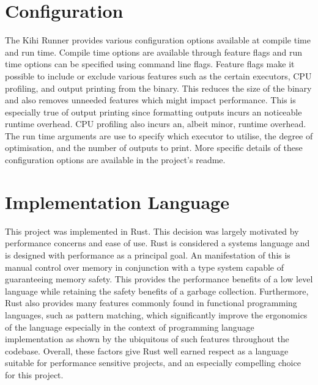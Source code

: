 \section{Configuration}
The Kihi Runner provides various configuration options available at compile time and run time. Compile time options are available through feature flags and run time options can be specified using command line flags. Feature flags make it possible to include or exclude various features such as the certain executors, CPU profiling, and output printing from the binary. This reduces the size of the binary and also removes unneeded features which might impact performance. This is especially true of output printing since formatting outputs incurs an noticeable runtime overhead. CPU profiling also incurs an, albeit minor, runtime overhead. The run time arguments are use to specify which executor to utilise, the degree of optimisation, and the number of outputs to print. More specific details of these configuration options are available in the project's readme.


\section{Implementation Language}
This project was implemented in Rust. This decision was largely motivated by performance concerns and ease of use. Rust is considered a systems language and is designed with performance as a principal goal. An manifestation of this is manual control over memory in conjunction with a type system capable of guaranteeing memory safety. This provides the performance benefits of a low level language while retaining the safety benefits of a garbage collection. Furthermore, Rust also provides many features commonly found in functional programming languages, such as pattern matching, which significantly improve the ergonomics of the language especially in the context of programming language implementation as shown by the ubiquitous of such features throughout the codebase. Overall, these factors give Rust well earned respect as a language suitable for performance sensitive projects, and an especially compelling choice for this project.

